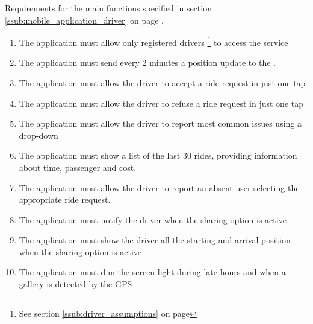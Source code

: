 \subsubsection{}
Requirements for the main functions specified in section \ref{ssub:mobile_application_driver} on page \pageref{ssub:mobile_application_driver}.
\begin{enumerate}[resume*]
	\item The application must allow only registered drivers \footnote{See section \ref{ssub:driver_assumptions} on page \pageref{ssub:driver_assumptions}} to access the service
	\item The application must send every 2 minutes a position update to the .
	\item The application must allow the driver to accept a ride request in just one tap
	\item The application must allow the driver to refuse a ride request in just one tap
	\item The application must allow the driver to report most common issues using a drop-down 
	\item The application must show a list of the last 30 rides, providing information about time, passenger and cost.
	\item The application must allow the driver to report an absent user selecting the appropriate ride request.
	\item The application must notify the driver when the sharing option is active
	\item The application must show the driver all the starting and arrival position when the sharing option is active
	\item The application must dim the screen light during late hours and when a gallery is detected by the GPS

\end{enumerate}

